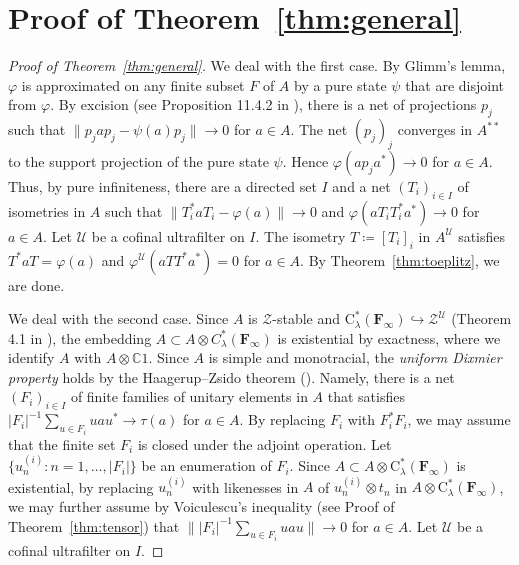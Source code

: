 \documentclass[12pt,nosumlimits,nonamelimits]{amsart}
\theoremstyle{remark}
\theoremstyle{definition}
\newcommand{\IC}{\mathbb{C}}
\newcommand{\bF}{\mathbf{F}}
\newcommand{\cU}{\mathcal{U}}
\newcommand{\cZ}{\mathcal{Z}}
\newcommand{\vp}{\varphi}
\begin{document}
\section{Proof of Theorem~\ref{thm:general}}

\begin{proof}[Proof of Theorem~\ref{thm:general}]
We deal with the first case. 
By Glimm's lemma, $\vp$ is approximated on 
any finite subset $F$ of $A$ by a pure state $\psi$ 
that are disjoint from $\vp$. 
By excision (see Proposition 11.4.2 in \cite{bo}), 
there is a net of projections $p_j$ such that 
$\| p_j a p_j - \psi(a)p_j \| \to 0$ for $a\in A$. 
The net $(p_j)_j$ converges in $A^{**}$ to the support 
projection of the pure state $\psi$. 
Hence $\vp(ap_ja^*)\to0$ for $a\in A$. 
Thus, by pure infiniteness, 
there are a directed set $I$ and a net $(T_i)_{i\in I}$ of isometries in $A$ such that 
$\|T_i^*a T_i-\vp(a)\| \to0$ and $\vp(aT_iT_i^*a^*)\to0$ 
for $a\in A$.
Let $\cU$ be a cofinal ultrafilter on $I$. 
The isometry $T \coloneq [T_i]_i$ in $A^\cU$ satisfies $T^*aT=\vp(a)$ and $\vp^\cU(aTT^*a^*)=0$ for $a\in A$. By Theorem~\ref{thm:toeplitz}, 
we are done.

We deal with the second case. 
Since $A$ is $\cZ$-stable and $\mathrm{C}^*_\lambda(\bF_\infty)\hookrightarrow \cZ^\cU$ (Theorem 4.1 in \cite{oz}), 
the embedding 
$A\subset A\otimes C^*_\lambda(\bF_\infty)$ 
is existential by exactness, 
where we identify $A$ with $A\otimes\IC1$.
Since $A$ is simple and monotracial, the \emph{uniform Dixmier 
property} holds by the Haagerup--Zsido theorem (\cite{hz}). 
Namely, there is a net $(F_i)_{i\in I}$ of finite families of unitary elements 
in $A$ that satisfies $|F_i|^{-1}\sum_{u\in F_i} uau^*\to\tau(a)$ for $a\in A$. 
By replacing $F_i$ with $F_i^*F_i$, we may assume that 
the finite set $F_i$ is closed under the adjoint operation. 
Let $\{ u^{(i)}_n : n=1,\ldots,|F_i| \}$ be an enumeration of $F_i$. 
Since 
$A\subset A\otimes \mathrm{C}^*_\lambda(\bF_\infty)$ is existential, 
by replacing $u^{(i)}_n$ with likenesses in $A$ of $u^{(i)}_n\otimes t_n$ 
in $A\otimes \mathrm{C}^*_\lambda(\bF_\infty)$, 
we may further assume by Voiculescu's inequality 
(see Proof of Theorem~\ref{thm:tensor}) that 
$\| |F_i|^{-1}\sum_{u\in F_i} uau\| \to0$ for $a\in A$. 
Let $\cU$ be a cofinal ultrafilter on $I$. 


\end{proof}
\end{document}

